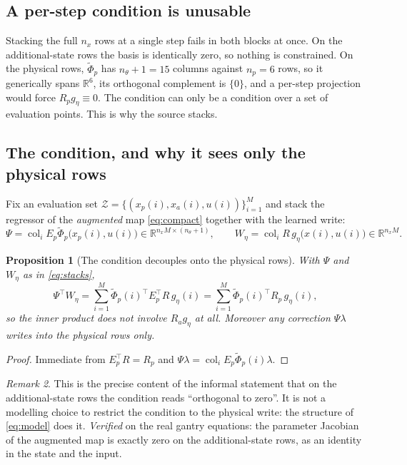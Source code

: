 \documentclass[11pt,a4paper]{article}
\newcommand{\R}{\mathbb R}
\newcommand{\col}{\operatorname{col}}
\newtheorem{proposition}{Proposition}[section]
\theoremstyle{remark}
\newtheorem{remark}[proposition]{Remark}
\begin{document}
\subsection{A per-step condition is unusable}

Stacking the full $n_x$ rows at a single step fails in both blocks at once. On the additional-state
rows the basis is identically zero, so nothing is constrained. On the physical rows,
$\widetilde\Phi_p$ has $n_\theta+1=15$ columns against $n_p=6$ rows, so it generically spans
$\R^{6}$, its orthogonal complement is $\{0\}$, and a per-step projection would force
$R_pg_\eta\equiv0$. The condition can only be a condition over a set of evaluation points. This is
why the source stacks.

\subsection{The condition, and why it sees only the physical rows}

Fix an evaluation set $\mathcal Z=\{(x_p(i),x_a(i),u(i))\}_{i=1}^{M}$ and stack the regressor of
the \emph{augmented} map \eqref{eq:compact} together with the learned write:
\begin{equation}\label{eq:stacks}
 \Psi=\col_i E_p\widetilde\Phi_p\bigl(x_p(i),u(i)\bigr)\in\R^{n_xM\times(n_\theta+1)},
 \qquad
 W_\eta=\col_i R\,g_\eta\bigl(x(i),u(i)\bigr)\in\R^{n_xM}.
\end{equation}

\begin{proposition}[The condition decouples onto the physical rows]\label{prop:decouple}
With $\Psi$ and $W_\eta$ as in \eqref{eq:stacks},
\begin{equation}\label{eq:decouple}
 \Psi^\top W_\eta=\sum_{i=1}^{M}\widetilde\Phi_p(i)^\top E_p^\top R\,g_\eta(i)
                 =\sum_{i=1}^{M}\widetilde\Phi_p(i)^\top R_p\,g_\eta(i),
\end{equation}
so the inner product does not involve $R_ag_\eta$ at all. Moreover any correction $\Psi\lambda$
writes into the physical rows only.
\end{proposition}
\begin{proof}
Immediate from $E_p^\top R=R_p$ and $\Psi\lambda=\col_iE_p\widetilde\Phi_p(i)\lambda$.
\end{proof}

\begin{remark}
This is the precise content of the informal statement that on the additional-state rows the
condition reads ``orthogonal to zero''. It is not a modelling choice to restrict the condition to
the physical write: the structure of \eqref{eq:model} does it. \emph{Verified} on the real gantry
equations: the parameter Jacobian of the augmented map is exactly zero on the additional-state
rows, as an identity in the state and the input.
\end{remark}
\end{document}
